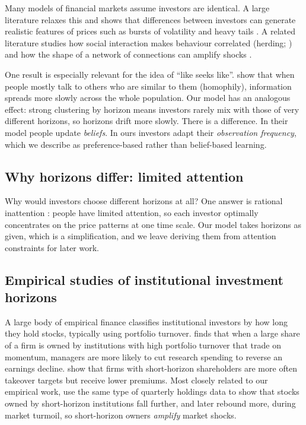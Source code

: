 Many models of financial markets assume investors are identical. A large literature relaxes this and shows that differences between investors can generate realistic features of prices such as bursts of volatility and heavy tails \citep{arthur1997,lebaron2001,cont2001,farmerfoley2009}. A related literature studies how social interaction makes behaviour correlated (herding; \citealp{bikhchandani1992,devenow1996}) and how the shape of a network of connections can amplify shocks \citep{acemoglu2015}.

One result is especially relevant for the idea of ``like seeks like''. \citet{golub2012} show that when people mostly talk to others who are similar to them (homophily), information spreads more slowly across the whole population. Our model has an analogous effect: strong clustering by horizon means investors rarely mix with those of very different horizons, so horizons drift more slowly. There is a difference. In their model people update \emph{beliefs}. In ours investors adapt their \emph{observation frequency}, which we describe as preference-based rather than belief-based learning.

\subsection{Why horizons differ: limited attention}

Why would investors choose different horizons at all? One answer is rational inattention \citep{sims2003,caplin2015}: people have limited attention, so each investor optimally concentrates on the price patterns at one time scale. Our model takes horizons as given, which is a simplification, and we leave deriving them from attention constraints for later work.

\subsection{Empirical studies of institutional investment horizons}

A large body of empirical finance classifies institutional investors by how long they hold stocks, typically using portfolio turnover. \citet{bushee1998} finds that when a large share of a firm is owned by institutions with high portfolio turnover that trade on momentum, managers are more likely to cut research spending to reverse an earnings decline. \citet{gaspar2005} show that firms with short-horizon shareholders are more often takeover targets but receive lower premiums. Most closely related to our empirical work, \citet{cella2013} use the same type of quarterly holdings data to show that stocks owned by short-horizon institutions fall further, and later rebound more, during market turmoil, so short-horizon owners \emph{amplify} market shocks.

